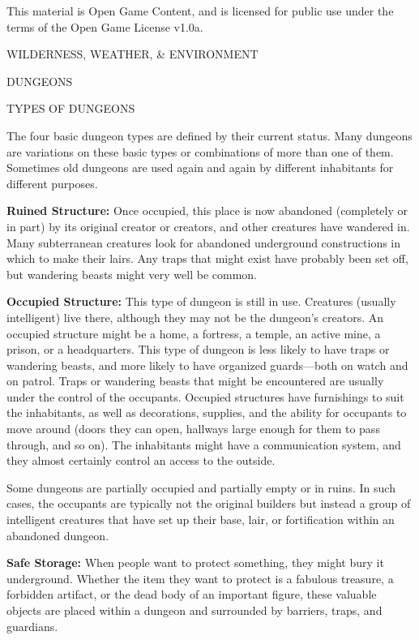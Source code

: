 \documentclass{article}
\begin{document}
This material is Open Game Content, and is licensed for public use under the terms 
of the Open Game License v1.0a.

{\LARGE{}WILDERNESS, WEATHER, \& ENVIRONMENT}

\vspace{12pt}
{\LARGE{}DUNGEONS}

TYPES OF DUNGEONS

The four basic dungeon types are defined by their current status. Many dungeons 
are variations on these basic types or combinations of more than one of them. Sometimes 
old dungeons are used again and again by different inhabitants for different purposes.

\textbf{Ruined Structure:} Once occupied, this place is now abandoned (completely 
or in part) by its original creator or creators, and other creatures have wandered 
in. Many subterranean creatures look for abandoned underground constructions in 
which to make their lairs. Any traps that might exist have probably been set off, 
but wandering beasts might very well be common.

\textbf{Occupied Structure:} This type of dungeon is still in use. Creatures (usually 
intelligent) live there, although they may not be the dungeon's creators. An occupied 
structure might be a home, a fortress, a temple, an active mine, a prison, or a 
headquarters. This type of dungeon is less likely to have traps or wandering beasts, 
and more likely to have organized guards---both on watch and on patrol. Traps or 
wandering beasts that might be encountered are usually under the control of the 
occupants. Occupied structures have furnishings to suit the inhabitants, as well 
as decorations, supplies, and the ability for occupants to move around (doors they 
can open, hallways large enough for them to pass through, and so on). The inhabitants 
might have a communication system, and they almost certainly control an access 
to the outside.

Some dungeons are partially occupied and partially empty or in ruins. In such cases, 
the occupants are typically not the original builders but instead a group of intelligent 
creatures that have set up their base, lair, or fortification within an abandoned 
dungeon.

\textbf{Safe Storage: }When people want to protect something, they might bury it 
underground. Whether the item they want to protect is a fabulous treasure, a forbidden 
artifact, or the dead body of an important figure, these valuable objects are placed 
within a dungeon and surrounded by barriers, traps, and guardians.
\end{document}
